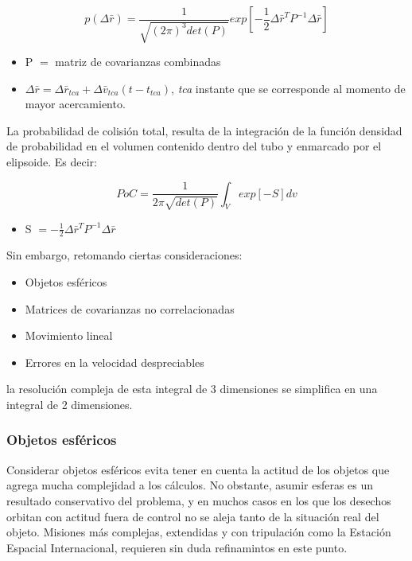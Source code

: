 \begin{equation}
 p(\Delta \bar{r})=\frac{1}{\sqrt{(2 \pi)^{3} det(P)}} exp [-\frac{1}{2}\Delta \bar{r}^{T}P^{-1}\Delta \bar{r}]
 \label{eq:densidadProbabilidad}
\end{equation}

\begin{itemize}
 \item P $=$ matriz de covarianzas combinadas
 \item $\Delta \bar{r} = \Delta \bar{r}_{tca} + \Delta \bar{v}_{tca}(t-t_{tca})$, {\it{tca}} instante que se corresponde al momento de mayor acercamiento. 
\end{itemize}

La probabilidad de colisi\'on total, resulta de la integraci\'on de la funci\'on densidad de probabilidad en el volumen contenido dentro del tubo y enmarcado por el elipsoide. Es decir: 

\begin{equation}
 PoC=\frac{1}{2 \pi \sqrt{det(P)}} \int_{V} exp [-S] dv
 \label{eq:pocintegralVolumen}
\end{equation}

\begin{itemize}
 \item S $= -\frac{1}{2}\Delta \bar{r}^{T}P^{-1}\Delta \bar{r}$
\end{itemize}

Sin embargo, retomando ciertas consideraciones: 

\begin{itemize}
 \item Objetos esf\'ericos
 \item Matrices de covarianzas no correlacionadas
 \item Movimiento lineal
 \item Errores en la velocidad despreciables
\end{itemize}


la resoluci\'on compleja de esta integral de 3 dimensiones se simplifica en una integral de 2 dimensiones. 

\subsubsection*{Objetos esf\'ericos}
Considerar objetos esf\'ericos evita tener en cuenta la actitud de los objetos que agrega mucha complejidad a los c\'alculos. No obstante, asumir esferas es un resultado conservativo del problema, y en muchos casos en los que los desechos orbitan con actitud fuera de control no se aleja tanto de la situaci\'on real del objeto. Misiones m\'as complejas, extendidas y con tripulaci\'on como la Estaci\'on Espacial Internacional, requieren sin duda refinamintos en este punto. 

